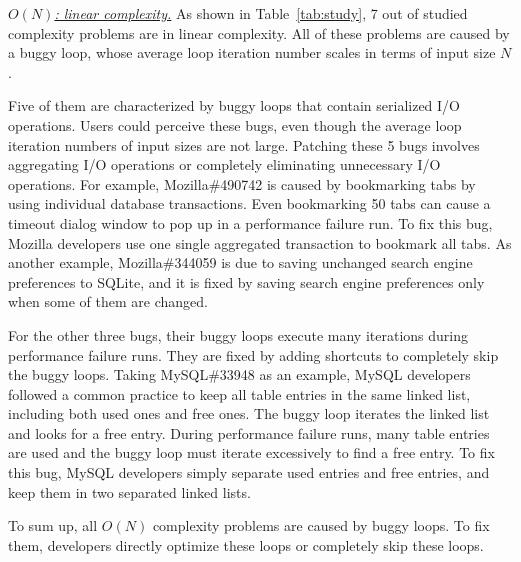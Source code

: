 {\underline{\textit{$O(N)$: linear complexity.}}} 
As shown in Table~\ref{tab:study}, 
7 out of \ComBugs studied complexity problems are in linear complexity. 
All of these problems are caused by a buggy loop, 
whose average loop iteration number scales in terms of input size $N$.

Five of them are characterized by buggy loops that contain serialized I/O operations.
Users could perceive these bugs, 
even though the average loop iteration numbers of input sizes are not large.
Patching these 5 bugs involves aggregating I/O operations 
or completely eliminating unnecessary I/O operations. 
For example, Mozilla\#490742 is caused by bookmarking 
tabs by using individual database transactions. 
Even bookmarking 50 tabs can cause a timeout dialog 
window to pop up in a performance failure run. 
To fix this bug, Mozilla developers use one single aggregated transaction 
to bookmark all tabs.
As another example, Mozilla\#344059 is due to saving unchanged 
search engine preferences to SQLite, 
and it is fixed by saving search 
engine preferences only when some of them are changed.


For the other three bugs,
their buggy loops execute many iterations during performance failure runs.
They are fixed by adding shortcuts to completely skip the buggy loops. 
Taking MySQL\#33948 as an example,
MySQL developers followed a common practice to keep all table entries in the same linked list, 
including both used ones and free ones. 
The buggy loop iterates the linked list and looks for a free entry.
During performance failure runs, 
many table entries are used and the buggy loop must iterate excessively to find a free entry.
To fix this bug, MySQL developers simply separate used entries and free entries,
and keep them in two separated linked lists. 

To sum up, all $O(N)$ complexity problems are caused by buggy loops. 
To fix them, developers directly optimize these loops or completely skip these loops. 





